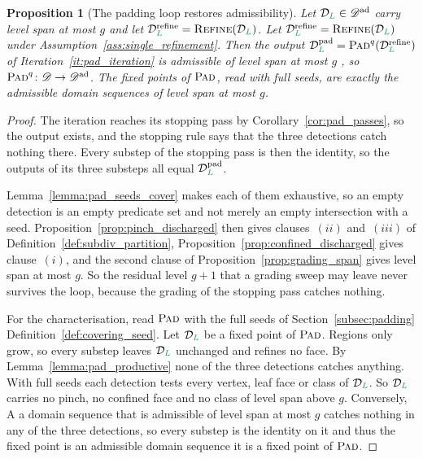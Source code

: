 \documentclass[a4paper, 12pt]{article}
\makeatletter
\newcommand{\robert}[1]{{\color{orange} #1}}
\newcommand{\green}{\color{ForestGreen}}
\renewcommand{\L}{{\green L}}
\newcommand{\allpartitions}{\mathscr{C}^{\mathrm{sp}}}
\newtheorem{proposition}[theorem]{Proposition}
\theoremstyle{definition}
\theoremstyle{plain}
\numberwithin{equation}{section}
\newcommand{\tobecut}[1]{{\color{red} #1}}     %
\DeclareRobustCommand{\domseq}[1][]{\mathcal{D}\ifx\@empty#1\@empty\else_{#1}\fi}
\newcommand{\alldomseqs}{\mathscr{D}}
\renewcommand{\allpartitions}{\mathscr{D}^{\mathrm{ad}}}
\makeatother
\begin{document}
\begin{proposition}[The padding loop restores admissibility]
    \label{prop:pad_terminates}
    \tobecut{Let $\domseq[\L] \in \allpartitions$ carry level span at most $g$ and let $\domseq[\L]^{\mathrm{refine}} = \textsc{Refine}(\domseq[\L])$.}\robert{Let $\domseq[\L]^{\mathrm{refine}} = \textsc{Refine}(\domseq[\L])$ under Assumption~\ref{ass:single_refinement}.} Then the output $\domseq[\L]^{\mathrm{pad}} = \textsc{Pad}^{q}(\domseq[\L]^{\mathrm{refine}})$ of Iteration~\ref{it:pad_iteration} is admissible of level span at most $g$\tobecut{, so $\textsc{Pad}^q \colon \alldomseqs \to \allpartitions$}. \robert{The fixed points of $\textsc{Pad}$, read with full seeds, are exactly the admissible domain sequences of level span at most $g$.}
\end{proposition}
\begin{proof}
    The iteration reaches its stopping pass by Corollary~\ref{cor:pad_passes}, so the output exists, and the stopping rule says that the three detections catch nothing there. \robert{Every substep of the stopping pass is then the identity, so the outputs of its three substeps all equal $\domseq[\L]^{\mathrm{pad}}$.}

    Lemma~\ref{lemma:pad_seeds_cover} makes each of them exhaustive, so an empty detection is an empty predicate set and not merely an empty intersection with a seed. Proposition~\ref{prop:pinch_discharged} then gives clauses~$(ii)$ and~$(iii)$ of Definition~\ref{def:subdiv_partition}, Proposition~\ref{prop:confined_discharged} gives clause~$(i)$, and the second clause of Proposition~\ref{prop:grading_span} gives level span at most $g$. \robert{So the residual level $g \! + \! 1$ that a grading sweep may leave never survives the loop, because the grading of the stopping pass catches nothing.}

    For the characterisation, read $\textsc{Pad}$ with the full seeds of \tobecut{Section~\ref{subsec:padding}}\robert{Definition~\ref{def:covering_seed}}. \robert{Let $\domseq[\L]$ be a fixed point of $\textsc{Pad}$. Regions only grow, so every substep leaves $\domseq[\L]$ unchanged and refines no face. By Lemma~\ref{lemma:pad_productive} none of the three detections catches anything. With full seeds each detection tests every vertex, leaf face or class of $\domseq[\L]$. So $\domseq[\L]$ carries no pinch, no confined face and no class of level span above $g$. Conversely,} \tobecut{A}\robert{a} domain sequence that is admissible of level span at most $g$ catches nothing in any of the three detections, so every substep is the identity on it and \tobecut{thus the fixed point is an admissible domain sequence}\robert{it is a fixed point of $\textsc{Pad}$}.
\end{proof}
\end{document}
